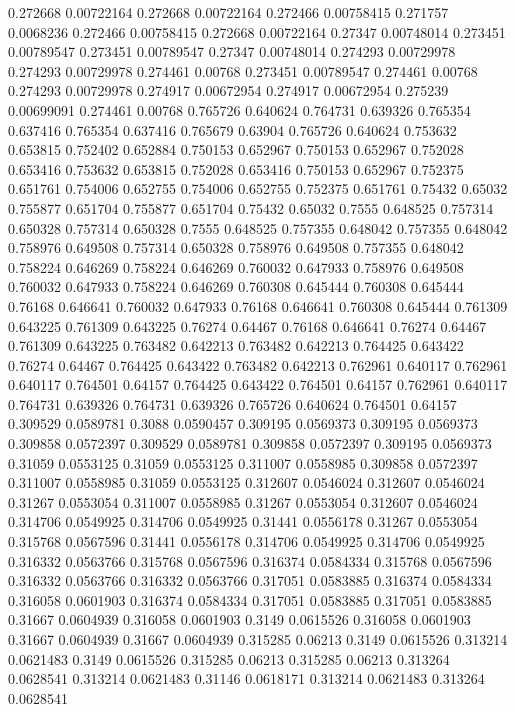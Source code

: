 0.272668 0.00722164
0.272668 0.00722164
0.272466 0.00758415
0.271757 0.0068236
0.272466 0.00758415
0.272668 0.00722164
0.27347 0.00748014
0.273451 0.00789547
0.273451 0.00789547
0.27347 0.00748014
0.274293 0.00729978
0.274293 0.00729978
0.274461 0.00768
0.273451 0.00789547
0.274461 0.00768
0.274293 0.00729978
0.274917 0.00672954
0.274917 0.00672954
0.275239 0.00699091
0.274461 0.00768
0.765726 0.640624
0.764731 0.639326
0.765354 0.637416
0.765354 0.637416
0.765679 0.63904
0.765726 0.640624
0.753632 0.653815
0.752402 0.652884
0.750153 0.652967
0.750153 0.652967
0.752028 0.653416
0.753632 0.653815
0.752028 0.653416
0.750153 0.652967
0.752375 0.651761
0.754006 0.652755
0.754006 0.652755
0.752375 0.651761
0.75432 0.65032
0.755877 0.651704
0.755877 0.651704
0.75432 0.65032
0.7555 0.648525
0.757314 0.650328
0.757314 0.650328
0.7555 0.648525
0.757355 0.648042
0.757355 0.648042
0.758976 0.649508
0.757314 0.650328
0.758976 0.649508
0.757355 0.648042
0.758224 0.646269
0.758224 0.646269
0.760032 0.647933
0.758976 0.649508
0.760032 0.647933
0.758224 0.646269
0.760308 0.645444
0.760308 0.645444
0.76168 0.646641
0.760032 0.647933
0.76168 0.646641
0.760308 0.645444
0.761309 0.643225
0.761309 0.643225
0.76274 0.64467
0.76168 0.646641
0.76274 0.64467
0.761309 0.643225
0.763482 0.642213
0.763482 0.642213
0.764425 0.643422
0.76274 0.64467
0.764425 0.643422
0.763482 0.642213
0.762961 0.640117
0.762961 0.640117
0.764501 0.64157
0.764425 0.643422
0.764501 0.64157
0.762961 0.640117
0.764731 0.639326
0.764731 0.639326
0.765726 0.640624
0.764501 0.64157
0.309529 0.0589781
0.3088 0.0590457
0.309195 0.0569373
0.309195 0.0569373
0.309858 0.0572397
0.309529 0.0589781
0.309858 0.0572397
0.309195 0.0569373
0.31059 0.0553125
0.31059 0.0553125
0.311007 0.0558985
0.309858 0.0572397
0.311007 0.0558985
0.31059 0.0553125
0.312607 0.0546024
0.312607 0.0546024
0.31267 0.0553054
0.311007 0.0558985
0.31267 0.0553054
0.312607 0.0546024
0.314706 0.0549925
0.314706 0.0549925
0.31441 0.0556178
0.31267 0.0553054
0.315768 0.0567596
0.31441 0.0556178
0.314706 0.0549925
0.314706 0.0549925
0.316332 0.0563766
0.315768 0.0567596
0.316374 0.0584334
0.315768 0.0567596
0.316332 0.0563766
0.316332 0.0563766
0.317051 0.0583885
0.316374 0.0584334
0.316058 0.0601903
0.316374 0.0584334
0.317051 0.0583885
0.317051 0.0583885
0.31667 0.0604939
0.316058 0.0601903
0.3149 0.0615526
0.316058 0.0601903
0.31667 0.0604939
0.31667 0.0604939
0.315285 0.06213
0.3149 0.0615526
0.313214 0.0621483
0.3149 0.0615526
0.315285 0.06213
0.315285 0.06213
0.313264 0.0628541
0.313214 0.0621483
0.31146 0.0618171
0.313214 0.0621483
0.313264 0.0628541
